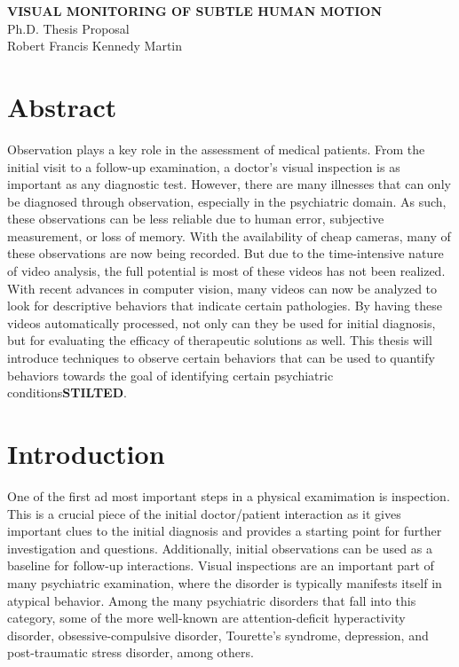 \documentclass[11pt]{article}
\begin{document}

%
\newpage
\thispagestyle{empty}
\begin{center}
\textbf{VISUAL MONITORING OF SUBTLE HUMAN MOTION}\\
Ph.D. Thesis Proposal\\
\bigskip
Robert Francis Kennedy Martin\\
\end{center}
\clearpage
{}
\section{Abstract}
\noindent
Observation plays a key role in the assessment of medical patients. From the initial visit to a follow-up examination, a doctor’s visual inspection is as important as any diagnostic test. However, there are many illnesses that can only be diagnosed through observation, especially in the psychiatric domain. As such, these observations can be less reliable due to human error, subjective measurement, or loss of memory. With the availability of cheap cameras, many of these observations are now being recorded. But due to the time-intensive nature of video analysis, the full potential is most of these videos has not been realized. With recent advances in computer vision, many videos can now be analyzed to look for descriptive behaviors that indicate certain pathologies. By having these videos automatically processed, not only can they be used for initial diagnosis, but for evaluating the efficacy of therapeutic solutions as well. This thesis will introduce techniques to observe certain behaviors that can be used to quantify behaviors towards the goal of identifying certain psychiatric conditions\textbf{STILTED}.
\section{Introduction}
\noindent
One of the first ad most important steps in a physical examimation is inspection. This is a crucial piece of the initial doctor/patient interaction as it gives important clues to the initial diagnosis and provides a starting point for further investigation and questions. Additionally, initial observations can be used as a baseline for follow-up interactions. Visual inspections are an important part of many psychiatric examination, where the disorder is typically manifests itself in atypical behavior. Among the many psychiatric disorders that fall into this category, some of the more well-known are attention-deficit hyperactivity disorder, obsessive-compulsive disorder, Tourette's syndrome, depression, and post-traumatic stress disorder, among others.
\end{document}
